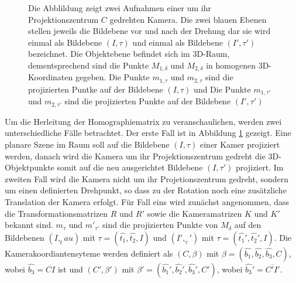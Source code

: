 \begin{figure}[!htb]
	\label{fig:HomographyPZSide}
	\endminipage\hfill
	\caption{Die Abblildung zeigt zwei Aufnahmen einer um ihr Projektionszentrum $C$ gedrehten Kamera. Die zwei blauen Ebenen stellen jeweils die Bildebene vor und nach der Drehung dar sie wird einmal als Bildebene $(I,\tau)$ und einmal als Bildebene $(I',\tau')$ bezeichnet. Die Objektebene befindet sich im 3D-Raum, dementsprechend sind die Punkte $M_{1,\delta}$ und $M_{2,\delta}$ in homogenen 3D-Koordinaten gegeben. Die Punkte $m_{1,\tau}$ und $m_{2,\tau}$ sind die projizierten Puntke auf der Bildebene $(I,\tau)$ und Die Punkte $m_{1,\tau'}$ und $m_{2,\tau'}$ sind die projizierten Punkte auf der Bildebene $(I',\tau')$}
	\label{fig:homographyRotatedProjectionCenter}
\end{figure}

Um die Herleitung der Homographiematrix zu veranschaulichen, werden zwei unterschiedliche Fälle betrachtet. Der erste Fall ist in Abbildung \ref{fig:homographyRotatedProjectionCenter} gezeigt. Eine planare Szene im Raum soll auf die Bildebene $(I,\tau)$ einer Kamer projiziert werden, danach wird die Kamera um ihr Projektionszentrum gedreht die 3D-Objektpunkte somit auf die neu ausgerichtet Bildebene $(I,\tau')$ projiziert. Im zweiten Fall wird die Kamera nicht um ihr Projetionszentrum gedreht, sondern um einen definierten Drehpunkt, so dass zu der Rotation noch eine zusätzliche Translation der Kamera erfolgt. Für Fall eins wird zunächst angenommen, dass die Transformationsmatrizen $R$ und $R'$ sowie die Kameramatrizen $K$ und $K'$ bekannt sind. $m_\tau$ und $m'_{\tau'}$ sind die projizierten Punkte von $M_\delta$ auf den Bildebenen $(I,_tau)$ mit $\tau=(\hat{t_1},\hat{t_2},I)$ und $(I',_\tau')$ mit $\tau=(\hat{t_1}',\hat{t_2}',I)$. Die Kamerakoordiantensyteme werden definiert als $(C,\beta)$ mit $\beta = (\hat{b_1},\hat{b_2},\hat{b_3},C)$, wobei $\hat{b_3} = \overline{CI}$ ist und $(C',\beta')$ mit $\beta' = (\hat{b_1}',\hat{b_2}',\hat{b_3}',C')$, wobei $\hat{b_3}' = \overline{C'I'}$\cite{Elements}. 

% 
  
